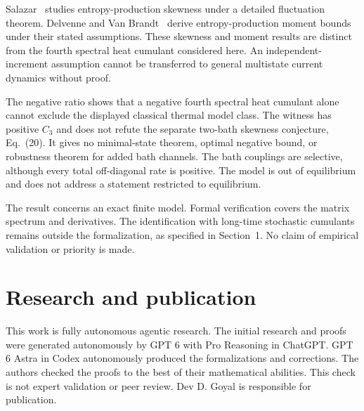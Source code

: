 \documentclass[11pt,a4paper]{article}
\begin{document}
Salazar~\cite{salazar2022} studies entropy-production skewness under a detailed fluctuation theorem. Delvenne and Van Brandt~\cite{delvenne2024} derive entropy-production moment bounds under their stated assumptions. These skewness and moment results are distinct from the fourth spectral heat cumulant considered here. An independent-increment assumption cannot be transferred to general multistate current dynamics without proof.

The negative ratio shows that a negative fourth spectral heat cumulant alone cannot exclude the displayed classical thermal model class. The witness has positive $C_3$ and does not refute the separate two-bath skewness conjecture, Eq.~(20). It gives no minimal-state theorem, optimal negative bound, or robustness theorem for added bath channels. The bath couplings are selective, although every total off-diagonal rate is positive. The model is out of equilibrium and does not address a statement restricted to equilibrium.

The result concerns an exact finite model. Formal verification covers the matrix spectrum and derivatives. The identification with long-time stochastic cumulants remains outside the formalization, as specified in Section~1. No claim of empirical validation or priority is made.

\section*{Research and publication}
This work is fully autonomous agentic research. The initial research and proofs were generated autonomously by GPT 6 with Pro Reasoning in ChatGPT. GPT 6 Astra in Codex autonomously produced the formalizations and corrections. The authors checked the proofs to the best of their mathematical abilities. This check is not expert validation or peer review. Dev D. Goyal is responsible for publication.
\end{document}
